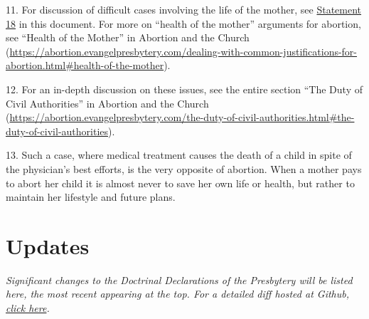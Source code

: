 \documentclass[
]{book}
\begin{document}
11. For discussion of difficult cases involving the life of the mother, see \protect\hyperlink{statement-18}{Statement 18} in this document. For more on ``health of the mother'' arguments for abortion, see ``Health of the Mother'' in Abortion and the Church (\url{https://abortion.evangelpresbytery.com/dealing-with-common-justifications-for-abortion.html\#health-of-the-mother}).

12. For an in-depth discussion on these issues, see the entire section ``The Duty of Civil Authorities'' in Abortion and the Church (\url{https://abortion.evangelpresbytery.com/the-duty-of-civil-authorities.html\#the-duty-of-civil-authorities}).

13. Such a case, where medical treatment causes the death of a child in spite of the physician's best efforts, is the very opposite of abortion. When a mother pays to abort her child it is almost never to save her own life or health, but rather to maintain her lifestyle and future plans.

\hypertarget{updates}{%
\chapter*{Updates}\label{updates}}

\emph{Significant changes to the Doctrinal Declarations of the Presbytery will be listed here, the most recent appearing at the top. For a detailed diff hosted at Github, \href{https://github.com/Evangel-Presbytery/evangel-ddp}{click here}.}
\end{document}
